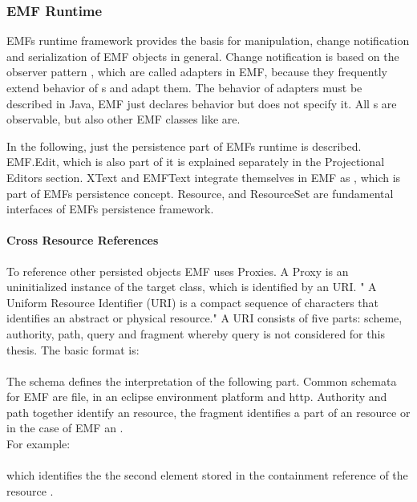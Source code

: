 \subsubsection{EMF Runtime}
EMFs runtime framework provides the basis for manipulation, change notification and serialization of EMF objects in general. \cite{EMF2nd} Change notification is based on the observer pattern \cite{patterns}, which are called adapters in EMF, because they frequently extend behavior of s and adapt them. The behavior of adapters must be described in Java, EMF just declares behavior but does not specify it. All s are observable, but also other EMF classes like  are.

In the following, just the persistence part of EMFs runtime is described. EMF.Edit, which is also part of it is explained separately in the Projectional Editors section. XText \cite{XTextMan} and EMFText \cite{EMFTextMan} integrate themselves in EMF as , which is part of EMFs persistence concept. Resource, and ResourceSet are fundamental interfaces of EMFs persistence framework.

\paragraph{Cross Resource References}
To reference other persisted objects EMF uses Proxies. A Proxy is an uninitialized instance of the target class, which is identified by an URI. " A Uniform Resource Identifier (URI) is a compact sequence of characters that identifies an abstract or physical resource." \cite{URI} A URI consists of five parts: scheme, authority, path, query and fragment whereby query is not considered for this thesis. The basic format is:\\
 \\
The schema defines the interpretation of the following part. Common schemata for EMF are file, in an eclipse environment platform and http. Authority and path together identify an resource, the fragment identifies a part of an resource or in the case of EMF an .\\
For example:\\
\\
which identifies the the second element stored in the containment reference  of the resource .



